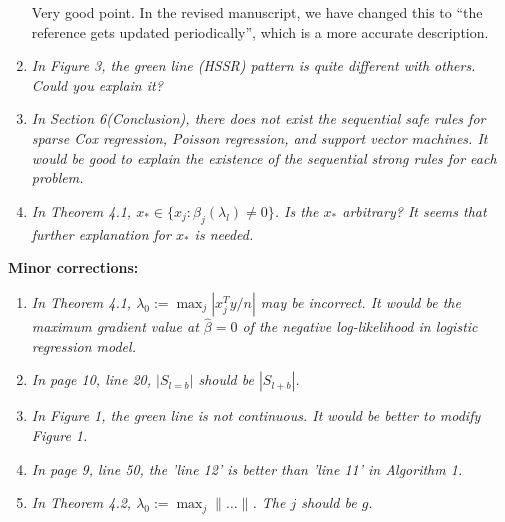 \documentclass{article}
\begin{document}
\begin{enumerate}
  Very good point. In the revised manuscript, we have changed this to ``the reference gets updated periodically'', which is a more accurate description.

\item \emph{In Figure 3, the green line (HSSR) pattern is quite different with others. Could you explain it?}

\item \emph{In Section 6(Conclusion), there does not exist the sequential safe rules for sparse Cox regression, Poisson regression, and support vector machines. It would be good to explain the existence of the sequential strong rules for each problem.}

\item \emph{In Theorem 4.1, $x_* \in \{ x_j : \hat{\beta}_j(\lambda_l) \ne 0 \}$. Is the $x_*$ arbitrary? It seems that further explanation for $x_*$ is needed.}

\end{enumerate}

\textbf{Minor corrections:}

\begin{enumerate}

\item \emph{In Theorem 4.1, $\lambda_0 := \max_j |x^T_j y/n|$ may be incorrect. It would be the maximum gradient value at $\hat{\beta} = 0$ of the negative log-likelihood in logistic regression model.}

\item \emph{In page 10, line 20, $|S_{l=b}|$ should be $|S_{l+b}|$.}

\item \emph{In Figure 1, the green line is not continuous. It would be better to modify Figure 1.}

\item \emph{In page 9, line 50, the ’line 12’ is better than ’line 11’ in Algorithm 1.}

\item \emph{In Theorem 4.2, $\lambda_0 := \max_j \lVert \ldots \rVert$. The $j$ should be $g$.}
  
\end{enumerate}
\end{document}
